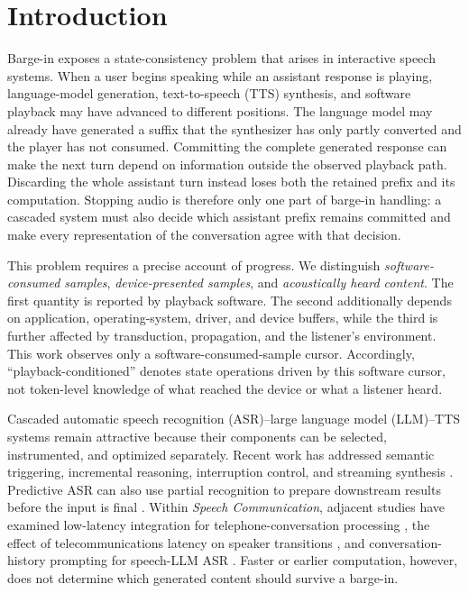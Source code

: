 \section{Introduction}
\label{sec:introduction}

Barge-in exposes a state-consistency problem that arises in interactive speech systems. When a user begins speaking while an assistant response is playing, language-model generation, text-to-speech (TTS) synthesis, and software playback may have advanced to different positions. The language model may already have generated a suffix that the synthesizer has only partly converted and the player has not consumed. Committing the complete generated response can make the next turn depend on information outside the observed playback path. Discarding the whole assistant turn instead loses both the retained prefix and its computation. Stopping audio is therefore only one part of barge-in handling: a cascaded system must also decide which assistant prefix remains committed and make every representation of the conversation agree with that decision.

This problem requires a precise account of progress. We distinguish \emph{software-consumed samples}, \emph{device-presented samples}, and \emph{acoustically heard content}. The first quantity is reported by playback software. The second additionally depends on application, operating-system, driver, and device buffers, while the third is further affected by transduction, propagation, and the listener's environment. This work observes only a software-consumed-sample cursor. Accordingly, ``playback-conditioned'' denotes state operations driven by this software cursor, not token-level knowledge of what reached the device or what a listener heard.

Cascaded automatic speech recognition (ASR)--large language model (LLM)--TTS systems remain attractive because their components can be selected, instrumented, and optimized separately. Recent work has addressed semantic triggering, incremental reasoning, interruption control, and streaming synthesis \citep{zou2026LTSVoiceAgent,mai2026RelayS2S,chen2025FireRedChat,du2024CosyVoice2}. Predictive ASR can also use partial recognition to prepare downstream results before the input is final \citep{schwarz2023PersonalizedPredictiveASR}. Within \emph{Speech Communication}, adjacent studies have examined low-latency integration for telephone-conversation processing \citep{morrone2024LowLatencyDiarization}, the effect of telecommunications latency on speaker transitions \citep{edwards2025TelecommunicationsLatency}, and conversation-history prompting for speech-LLM ASR \citep{zheng2026MultilevelContextualPrompting}. Faster or earlier computation, however, does not determine which generated content should survive a barge-in.

